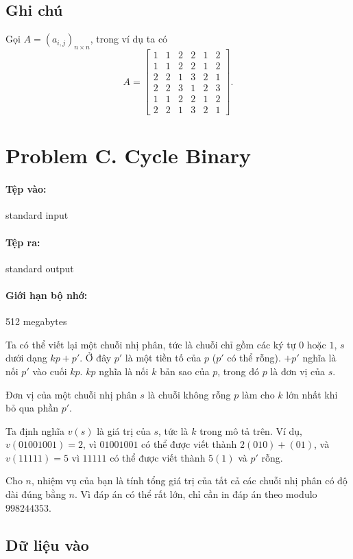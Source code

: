 \documentclass[11pt]{article}
\begin{document}
\subsection*{Ghi chú}

Gọi \(A=(a_{i,j})_{n\times n}\), trong ví dụ ta có
\[
  A=
  \begin{bmatrix}
  1&1&2&2&1&2\\
  1&1&2&2&1&2\\
  2&2&1&3&2&1\\
  2&2&3&1&2&3\\
  1&1&2&2&1&2\\
  2&2&1&3&2&1
  \end{bmatrix}.
\]

\section{Problem C. Cycle Binary}

\paragraph{Tệp vào:} standard input
\paragraph{Tệp ra:} standard output
\paragraph{Giới hạn bộ nhớ:} 512 megabytes

Ta có thể viết lại một chuỗi nhị phân, tức là chuỗi chỉ gồm các ký tự \(0\)
hoặc \(1\), \(s\) dưới dạng \(kp+p'\). Ở đây \(p'\) là một tiền tố của \(p\)
(\(p'\) có thể rỗng). \(+p'\) nghĩa là nối \(p'\) vào cuối \(kp\). \(kp\)
nghĩa là nối \(k\) bản sao của \(p\), trong đó \(p\) là đơn vị của \(s\).

Đơn vị của một chuỗi nhị phân \(s\) là chuỗi không rỗng \(p\) làm cho \(k\)
lớn nhất khi bỏ qua phần \(p'\).

Ta định nghĩa \(v(s)\) là giá trị của \(s\), tức là \(k\) trong mô tả trên.
Ví dụ, \(v(01001001)=2\), vì \(01001001\) có thể được viết thành
\(2(010)+(01)\), và \(v(11111)=5\) vì \(11111\) có thể được viết thành
\(5(1)\) và \(p'\) rỗng.

Cho \(n\), nhiệm vụ của bạn là tính tổng giá trị của tất cả các chuỗi nhị
phân có độ dài đúng bằng \(n\). Vì đáp án có thể rất lớn, chỉ cần in đáp án
theo modulo \(998244353\).

\subsection*{Dữ liệu vào}
\end{document}
